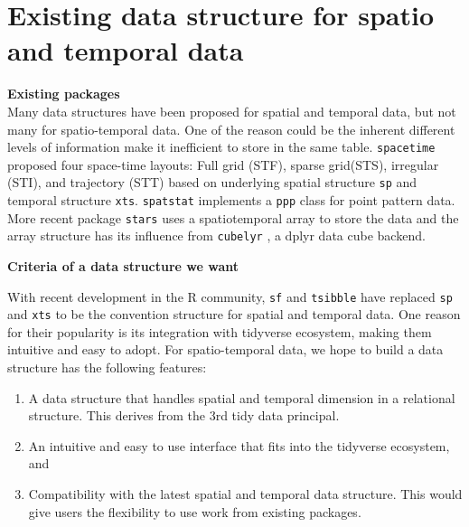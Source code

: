 \documentclass[
]{jss}
\providecommand{\tightlist}{%
  \setlength{\itemsep}{0pt}\setlength{\parskip}{0pt}}
\begin{document}
\newpage

\hypertarget{existing-data-structure-for-spatio-and-temporal-data}{%
\section{Existing data structure for spatio and temporal
data}\label{existing-data-structure-for-spatio-and-temporal-data}}

\textbf{Existing packages}\\
Many data structures have been proposed for spatial and temporal data,
but not many for spatio-temporal data. One of the reason could be the
inherent different levels of information make it inefficient to store in
the same table. \texttt{spacetime}\citep{spacetime} proposed four
space-time layouts: Full grid (STF), sparse grid(STS), irregular (STI),
and trajectory (STT) based on underlying spatial structure \texttt{sp}
\citep{sp} and temporal structure \texttt{xts}\citep{xts}.
\texttt{spatstat} \citep{spatstat} implements a \texttt{ppp} class for
point pattern data. More recent package \texttt{stars} \citep{stars}
uses a spatiotemporal array to store the data and the array structure
has its influence from \texttt{cubelyr} \citep{cubelyr}, a dplyr data
cube backend. \newline

\textbf{Criteria of a data structure we want}

With recent development in the R community, \texttt{sf} \citep{sf} and
\texttt{tsibble}\citep{tsibble} have replaced \texttt{sp} and
\texttt{xts} to be the convention structure for spatial and temporal
data. One reason for their popularity is its integration with tidyverse
ecosystem, making them intuitive and easy to adopt. For spatio-temporal
data, we hope to build a data structure has the following features:

\begin{enumerate}
\def\labelenumi{\arabic{enumi})}
\tightlist
\item
  A data structure that handles spatial and temporal dimension in a
  relational structure. This derives from the 3rd tidy data principal.
\item
  An intuitive and easy to use interface that fits into the tidyverse
  ecosystem, and
\item
  Compatibility with the latest spatial and temporal data structure.
  This would give users the flexibility to use work from existing
  packages.
\end{enumerate}
\end{document}
